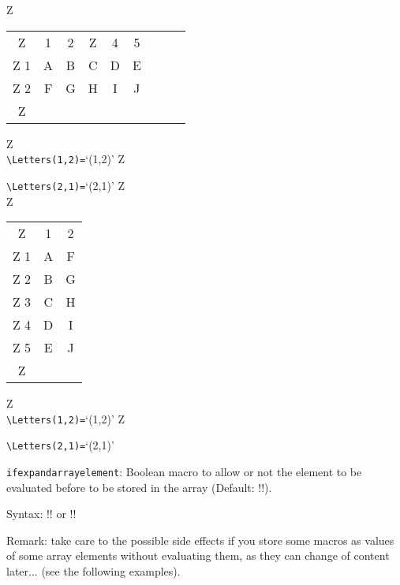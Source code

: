 \documentclass{article}
\newenvironment{Description}[1]{%
\begin{list}{nothing}{\setlength{\leftmargin}{#1}
\setlength{\labelwidth}{\leftmargin}\setlength{\labelsep}{1mm}}}
{\end{list}}
\newcommand{\BS}{\texttt{\symbol{`\\}}}
\newcommand{\Macro}[1]{\texttt{\BS#1}}
\newcommand{\FormatTeXMacro}[1]{\Macro{#1}\hfill :}
\begin{document}
\begin{SideBySideExample}[xrightmargin=6cm]
  \newarray\Letters

  Z\begin{tabular}{c|c|c|c|c|c|c|c|c|}
  Z \multicolumn{1}{c}{}  & \multicolumn{1}{c}{1} & \multicolumn{1}{c}{2} &
  Z \multicolumn{1}{c}{3} & \multicolumn{1}{c}{4} & \multicolumn{1}{c}{5} \\ \cline{2-6}
  Z 1 & A & B & C & D & E \\ \cline{2-6}
  Z 2 & F & G & H & I & J \\ \cline{2-6}
  Z\end{tabular}
  Z\\[2mm]
  \verb+\Letters(1,2)=+`\Letters(1,2)'
  Z\par
  \verb+\Letters(2,1)=+`\Letters(2,1)'
  Z\\[2mm]
  Z\begin{tabular}{c|c|c|}
  Z \multicolumn{1}{c}{} & \multicolumn{1}{c}{1} & \multicolumn{1}{c}{2} \\ \cline{2-3}
  Z 1 & A & F \\ \cline{2-3}
  Z 2 & B & G \\ \cline{2-3}
  Z 3 & C & H \\ \cline{2-3}
  Z 4 & D & I \\ \cline{2-3}
  Z 5 & E & J \\ \cline{2-3}
  Z\end{tabular}
  Z\\[2mm]
  \normalindextrue
  \verb+\Letters(1,2)=+`\Letters(1,2)'
  Z\par
  \verb+\Letters(2,1)=+`\Letters(2,1)'
\end{SideBySideExample}

\begin{Description}{4cm}
  \item[\FormatTeXMacro{ifexpandarrayelement}] Boolean macro to allow or not
  the element to be evaluated before to be stored in the array (Default:
  !\expandarrayelementfalse!).

       Syntax: !\expandarrayelementtrue! or !\expandarrayelementfalse!

       Remark: take care to the possible side effects if you store some macros
       as values of some array elements without evaluating them, as they can
       change of content later... (see the following examples).
\end{Description}
\end{document}
